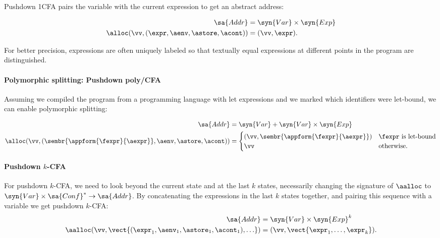   Pushdown 1CFA pairs the variable with the current expression to get
  an abstract address:

  \begin{align*}
  \sa{Addr} &= \syn{Var} \times \syn{Exp}
  \\
    \alloc(\vv,(\expr,\aenv,\astore,\acont)) &= (\vv,\expr)
    \text.
    \end{align*}

  For better precision, expressions are often uniquely labeled so that textually equal expressions at different points in the program are distinguished.

    \paragraph{Polymorphic splitting: Pushdown poly/CFA}

    Assuming we compiled the program from a programming language with
    let expressions and we marked which identifiers were let-bound, we
    can enable polymorphic splitting:

    \begin{align*}
    \sa{Addr} &= \syn{Var} + \syn{Var} \times \syn{Exp} 
    \\
      \alloc(\vv,(\sembr{\appform{\fexpr}{\aexpr}},\aenv,\astore,\acont)) &= 
      \begin{cases}
      (\vv,\sembr{\appform{\fexpr}{\aexpr}}) & \fexpr \text{ is let-bound}
      \\
        \vv & \text{otherwise}
        \text.
        \end{cases}
        \end{align*}


        \paragraph{Pushdown $k$-CFA}

        For pushdown $k$-CFA, we need to look beyond the current state
        and at the last $k$ states, necessarily changing the signature of $\aalloc$ to $\syn{Var} \times \sa{Conf}^* \to \sa{Addr}$.
By concatenating the expressions in the last $k$ states together, and
        pairing this sequence with a variable we get pushdown $k$-CFA:
\begin{align*}
        \sa{Addr} &= \syn{Var} \times \syn{Exp}^k
        \\
          \aalloc(\vv,\vect{(\expr_1,\aenv_1,\astore_1,\acont_1),\ldots}) &=
(\vv,\vect{\expr_1,\ldots,\expr_k})
  \text.
  \end{align*}






